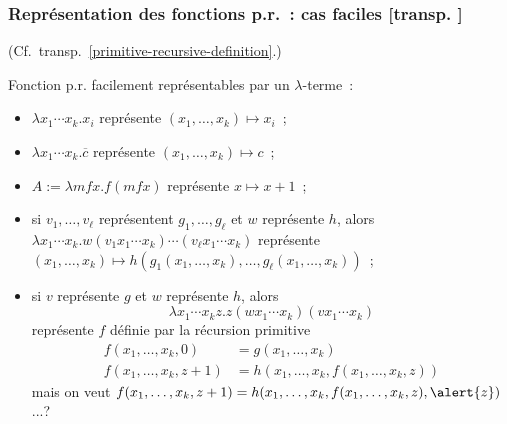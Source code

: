 \documentclass[mathserif,a4paper,aspectratio=169]{beamer}
\renewcommand{\frametitle}[1]{\subsubsection*{#1 {\footnotesize[transp. \insertframenumber]}}}
\begin{document}
\begin{frame}
\frametitle{Représentation des fonctions p.r. : cas faciles}

{\footnotesize (Cf. transp. \ref{primitive-recursive-definition}.)\par}

Fonction p.r. facilement représentables par un $\lambda$-terme :
\begin{itemize}
\item $\lambda x_1\cdots x_k.x_i$ représente $(x_1,\ldots,x_k) \mapsto x_i$ ;
\item $\lambda x_1\cdots x_k.\overline{c}$ représente
  $(x_1,\ldots,x_k) \mapsto c$ ;
\item $A := \lambda mfx.f(mfx)$ représente $x \mapsto x+1$ ;
\item si $v_1,\ldots,v_\ell$ représentent $g_1,\ldots,g_\ell$ et $w$
  représente $h$, alors $\lambda x_1\cdots x_k.w(v_1 x_1\cdots
  x_k)\cdots (v_\ell x_1\cdots x_k)$ représente $(x_1,\ldots,x_k)
  \mapsto h(g_1(x_1,\ldots,x_k),\ldots, g_\ell(x_1,\ldots,x_k))$ ;
\item si $v$ représente $g$ et $w$ représente $h$, alors
\[
\lambda x_1\cdots x_k z.z(wx_1\cdots x_k)(vx_1\cdots x_k)
\]
représente $f$ définie par la récursion primitive
\[
\begin{aligned}
f(x_1,\ldots,x_k,0) &= g(x_1,\ldots,x_k)\\
f(x_1,\ldots,x_k,z+1) &= h(x_1,\ldots,x_k,f(x_1,\ldots,x_k,z))
\end{aligned}
\]
\alert{mais} on veut $f(x_1,\ldots,x_k,z+1) =
h(x_1,\ldots,x_k,f(x_1,\ldots,x_k,z),\alert{z})$...?
\end{itemize}

\end{frame}
%
\end{document}
